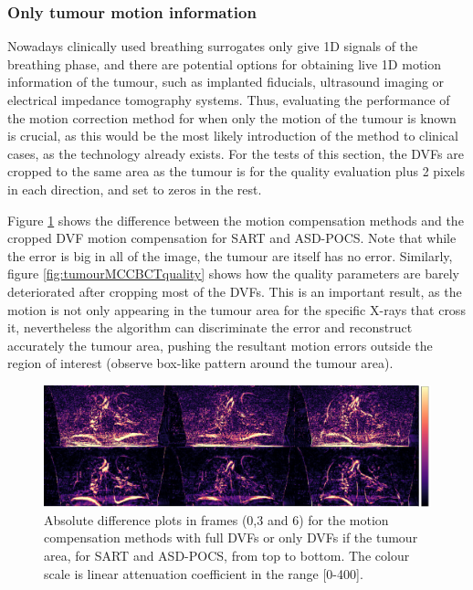 \subsubsection{Only tumour motion information}

Nowadays clinically used breathing surrogates only give 1D signals of the breathing phase, and there are potential options for obtaining live 1D motion information of the tumour, such as implanted fiducials, ultrasound imaging\cite{western2015ultrasound} or electrical impedance tomography\cite{song2009non}\cite{pengpan2010motion} systems. Thus, evaluating the performance of the motion correction method for when only the motion of the tumour is known is crucial, as this would be the most likely introduction of the method to clinical cases, as the technology already exists. For the tests of this section, the DVFs are cropped to the same area as the tumour is for the quality evaluation plus 2 pixels in each direction, and set to zeros in the rest.

Figure \ref{fig:tumourMCCBCT3static} shows the difference between the motion compensation methods and the cropped DVF motion compensation for SART and ASD-POCS. Note that while the error is big in all of the image, the tumour are itself has no error. Similarly, figure \ref{fig:tumourMCCBCTquality} shows how the quality parameters are barely deteriorated after cropping most of the DVFs. This is an important result, as the motion is not only appearing in the tumour area for the specific X-rays that cross it, nevertheless the algorithm can discriminate the error and reconstruct accurately the tumour area, pushing the resultant motion errors outside the region of interest (observe box-like pattern around the tumour area).



\begin{figure}
\begin{center}

\includegraphics[width=\textwidth]{accuracyMC/difftumourMCCBCT3stage.png} 


\end{center}

\caption[Three difference frames of the  motion compensation methods with DVFs only in the tumour]{\label{fig:tumourMCCBCT3static} Absolute difference plots in frames (0,3 and 6) for the motion compensation methods with full DVFs or only DVFs if the tumour area, for SART and ASD-POCS, from top to bottom.  The colour scale is linear attenuation coefficient in the range [0-400].} 

\end{figure}


